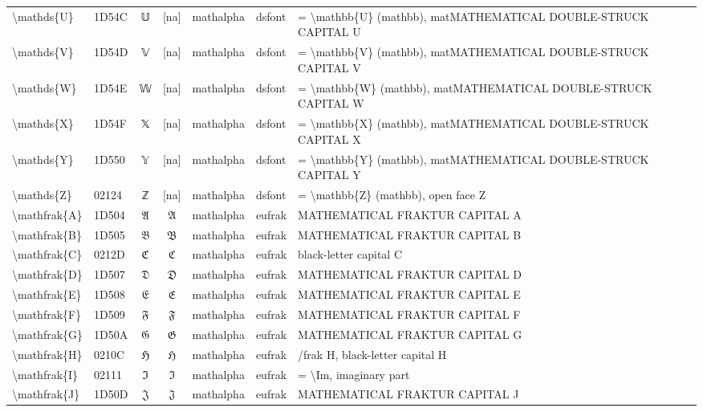 \documentclass[a4paper,landscape]{article}
\begin{document}
\begin{longtable}{llcclll}
\textbackslash{}mathds\{U\} & 1D54C & 𝕌 & [na] & mathalpha & dsfont & = \textbackslash{}mathbb\{U\} (mathbb),  matMATHEMATICAL DOUBLE-STRUCK CAPITAL U \\
\textbackslash{}mathds\{V\} & 1D54D & 𝕍 & [na] & mathalpha & dsfont & = \textbackslash{}mathbb\{V\} (mathbb),  matMATHEMATICAL DOUBLE-STRUCK CAPITAL V \\
\textbackslash{}mathds\{W\} & 1D54E & 𝕎 & [na] & mathalpha & dsfont & = \textbackslash{}mathbb\{W\} (mathbb),  matMATHEMATICAL DOUBLE-STRUCK CAPITAL W \\
\textbackslash{}mathds\{X\} & 1D54F & 𝕏 & [na] & mathalpha & dsfont & = \textbackslash{}mathbb\{X\} (mathbb),  matMATHEMATICAL DOUBLE-STRUCK CAPITAL X \\
\textbackslash{}mathds\{Y\} & 1D550 & 𝕐 & [na] & mathalpha & dsfont & = \textbackslash{}mathbb\{Y\} (mathbb),  matMATHEMATICAL DOUBLE-STRUCK CAPITAL Y \\
\textbackslash{}mathds\{Z\} & 02124 & ℤ & [na] & mathalpha & dsfont & = \textbackslash{}mathbb\{Z\} (mathbb),  open face Z \\
\textbackslash{}mathfrak\{A\} & 1D504 & 𝔄 & $\mathfrak{A}$ & mathalpha & eufrak & MATHEMATICAL FRAKTUR CAPITAL A \\
\textbackslash{}mathfrak\{B\} & 1D505 & 𝔅 & $\mathfrak{B}$ & mathalpha & eufrak & MATHEMATICAL FRAKTUR CAPITAL B \\
\textbackslash{}mathfrak\{C\} & 0212D & ℭ & $\mathfrak{C}$ & mathalpha & eufrak & black-letter capital C \\
\textbackslash{}mathfrak\{D\} & 1D507 & 𝔇 & $\mathfrak{D}$ & mathalpha & eufrak & MATHEMATICAL FRAKTUR CAPITAL D \\
\textbackslash{}mathfrak\{E\} & 1D508 & 𝔈 & $\mathfrak{E}$ & mathalpha & eufrak & MATHEMATICAL FRAKTUR CAPITAL E \\
\textbackslash{}mathfrak\{F\} & 1D509 & 𝔉 & $\mathfrak{F}$ & mathalpha & eufrak & MATHEMATICAL FRAKTUR CAPITAL F \\
\textbackslash{}mathfrak\{G\} & 1D50A & 𝔊 & $\mathfrak{G}$ & mathalpha & eufrak & MATHEMATICAL FRAKTUR CAPITAL G \\
\textbackslash{}mathfrak\{H\} & 0210C & ℌ & $\mathfrak{H}$ & mathalpha & eufrak & /frak H, black-letter capital H \\
\textbackslash{}mathfrak\{I\} & 02111 & ℑ & $\mathfrak{I}$ & mathalpha & eufrak & = \textbackslash{}Im,  imaginary part \\
\textbackslash{}mathfrak\{J\} & 1D50D & 𝔍 & $\mathfrak{J}$ & mathalpha & eufrak & MATHEMATICAL FRAKTUR CAPITAL J \\

\end{longtable}
\end{document}
